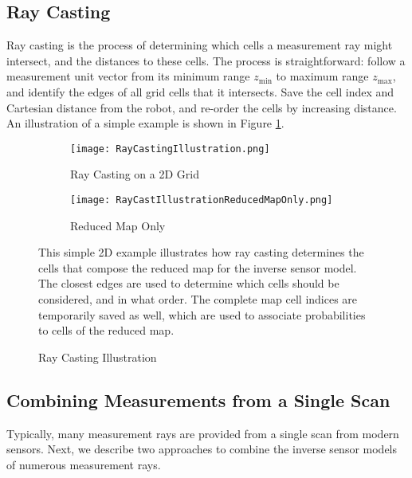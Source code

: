 \subsection{Ray Casting}
\label{sec:RayCasting}

Ray casting is the process of determining which cells a measurement ray might intersect, and the distances to these cells. The process is straightforward: follow a measurement unit vector from its minimum range $z_\text{min}$ to maximum range $z_\text{max}$, and identify the edges of all grid cells that it intersects. Save the cell index and Cartesian distance from the robot, and re-order the cells by increasing distance. An illustration of a simple example is shown in Figure \ref{fig:RayCastingIllustration}.

\begin{figure}[!ht]
    \centering
    \begin{subfigure}[t]{0.4\columnwidth}
        \centering
        \texttt{[image: RayCastingIllustration.png]}
        \caption{Ray Casting on a 2D Grid}
    \end{subfigure}
    \hspace*{0.05\columnwidth}
    \begin{subfigure}[t]{0.4\columnwidth}
        \centering
        \texttt{[image: RayCastIllustrationReducedMapOnly.png]}
        \caption{Reduced Map Only}
    \end{subfigure}
    \caption{Ray Casting Illustration}
    \label{fig:RayCastingIllustration}
    	\medskip
  	\small
	This simple 2D example illustrates how ray casting determines the cells that compose the reduced map for the inverse sensor model. The closest edges are used to determine which cells should be considered, and in what order. The complete map cell indices are temporarily saved as well, which are used to associate probabilities to cells of the reduced map.
\end{figure}

\subsection{Combining Measurements from a Single Scan}
\label{sec:RayScanComb}
Typically, many measurement rays are provided from a single scan from modern sensors.
Next, we describe two approaches to combine the inverse sensor models of numerous measurement rays.

